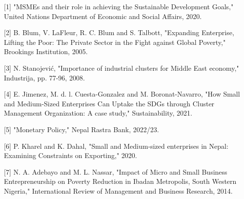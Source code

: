 \documentclass[a4paper]{article}
\begin{document}
[1] "MSMEs and their role in achieving the Sustainable Development Goals," United Nations Department of Economic and Social Affairs, 2020.

[2] B. Blum, V. LaFleur, R. C. Blum and S. Talbott, "Expanding Enterprise, Lifting the Poor: The Private Sector in the Fight against Global Poverty," Brookings Institution, 2005.

[3] N. Stanojević, "Importance of industrial clusters for Middle East economy," Industrija, pp. 77-96, 2008. 

[4] E. Jimenez, M. d. l. Cuesta-Gonzalez and M. Boronat-Navarro, "How Small and Medium-Sized Enterprises Can Uptake the SDGs through Cluster Management Organization: A case study," Sustainability, 2021. 

[5] "Monetary Policy," Nepal Rastra Bank, 2022/23.

[6] P. Kharel and K. Dahal, "Small and Medium-sized enterprises in Nepal: Examining Constraints on Exporting," 2020.

[7] N. A. Adebayo and M. L. Nassar, "Impact of Micro and Small Business Entrepreneurship on Poverty Reduction in Ibadan Metropolis, South Western Nigeria," International Review of Management and Business Research, 2014. 
\end{document}
